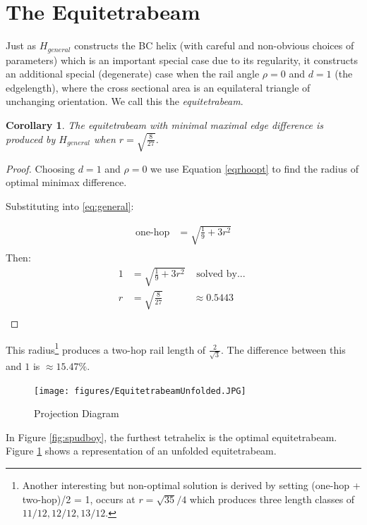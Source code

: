 \documentclass[11pt]{article}
\newtheorem{corollary}{Corollary}
\begin{document}
\section{The Equitetrabeam}

Just as $H_{general}$ constructs the BC helix (with careful and non-obvious choices of parameters)
which is an important
special case due to its regularity, it constructs an additional special
(degenerate) case when the rail angle $\rho = 0$
and $d = 1$ (the edgelength), where the cross sectional area is
an equilateral triangle of unchanging orientation.
We call this the \emph{equitetrabeam}.


\begin{corollary}
  The equitetrabeam with minimal maximal edge difference is produced
  by $H_{general}$ when $ r = \sqrt{\frac{8}{27}} $.
\end{corollary}

\begin{proof}
Choosing $d = 1$ and $\rho = 0$ we use Equation \eqref{eqrhoopt} to find the radius of 
optimal minimax difference.

Substituting into \eqref{eq:general}:

\begin{align*}
  \text{one-hop} &= \sqrt{\frac{1}{9} + 3r^2}\\
\end{align*}
Then:
\begin{align*}
   1  &=  \sqrt{\frac{1}{9} + 3r^2} & \text{ solved by... }\\
   r  &= \sqrt{\frac{8}{27}} &\approx 0.5443 \\
\end{align*}
\end{proof}

This radius\footnote{Another interesting but non-optimal solution is derived by setting (one-hop + two-hop)/2 = 1,
  occurs at $r = \sqrt{35}/4$ which produces
  three length classes of $11/12, 12/12, 13/12$.}
produces a two-hop rail length of $\frac{2}{\sqrt{3}}$.
The difference between this and $1$ is $\approx 15.47\% $.




\begin{figure}[H]
  \label{fig:unfolded}
     \centering
     \texttt{[image: figures/EquitetrabeamUnfolded.JPG]}
     \caption{Projection Diagram}
\end{figure}

In Figure \ref{fig:spudboy}, the furthest tetrahelix is the optimal equitetrabeam.
Figure \ref{fig:unfolded} shows a representation of an unfolded equitetrabeam.
\end{document}
